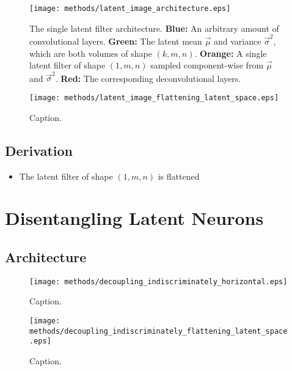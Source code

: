 \begin{figure}[H]
\centering
\captionsetup{justification=centering}
\texttt{[image: methods/latent\_image\_architecture.eps]}
\caption{The single latent filter architecture. \textbf{Blue:} An arbitrary amount of convolutional layers. \textbf{Green:} The latent mean $\vec{\mu}$ and variance $\vec{\sigma}^2$, which are both volumes of shape $(k, m, n)$. \textbf{Orange:} A single latent filter of shape $(1, m, n)$ sampled component-wise from $\vec{\mu}$ and $\vec{\sigma}^2$. \textbf{Red:} The corresponding deconvolutional layers.}
\label{fig:latent_image_architecture}
\end{figure}

\begin{figure}[h!]
\centering
\captionsetup{justification=centering}
\texttt{[image: methods/latent\_image\_flattening\_latent\_space.eps]}
\caption{Caption.}
\label{fig:latent_image_flattening_latent_space}
\end{figure}

\subsection{Derivation}
\begin{itemize}
\item The latent filter of shape $(1, m, n)$ is flattened 
\end{itemize}

%
%
%
%
%
\section{Disentangling Latent Neurons}
\lipsum[2]
\subsection{Architecture}
\begin{figure}[h!]
\centering
\captionsetup{justification=centering}
\texttt{[image: methods/decoupling\_indiscriminately\_horizontal.eps]}
\caption{Caption.}
\label{fig:decoupling_indiscriminately_horizontal}
\end{figure}

\begin{figure}[h!]
\centering
\captionsetup{justification=centering}
\texttt{[image: methods/decoupling\_indiscriminately\_flattening\_latent\_space.eps]}
\caption{Caption.}
\label{fig:decoupling_indiscriminately_flattening_latent_space}
\end{figure}

